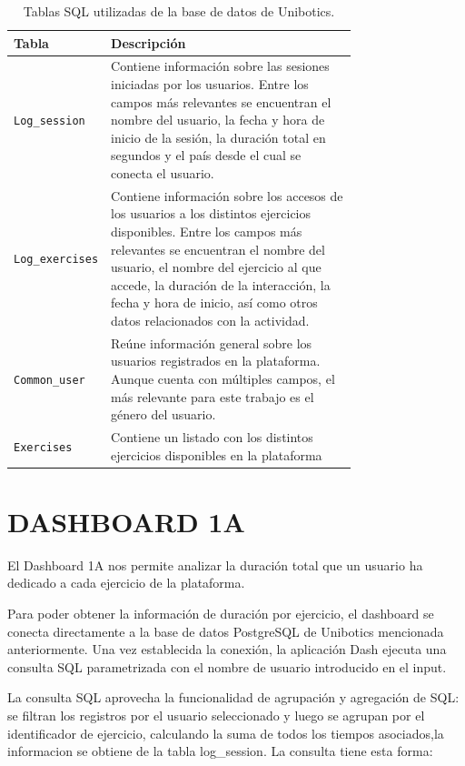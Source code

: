 \documentclass[a4paper, 12pt]{book}
\begin{document}
\begin{table}[!htb]
\centering
\caption{Tablas SQL utilizadas de la base de datos de Unibotics.}
\label{tbl:sql-tables}
\begin{tabular}{lp{0.75\linewidth}}
\toprule
\textbf{Tabla} & \textbf{Descripción} \\
\midrule
\texttt{Log\_session} & Contiene información sobre las sesiones iniciadas por los usuarios. Entre los campos más relevantes se encuentran el nombre del usuario, la fecha y hora de inicio de la sesión, la duración total en segundos y el país desde el cual se conecta el usuario. \\
\texttt{Log\_exercises} & Contiene información sobre los accesos de los usuarios a los distintos ejercicios disponibles. Entre los campos más relevantes se encuentran el nombre del usuario, el nombre del ejercicio al que accede, la duración de la interacción, la fecha y hora de inicio, así como otros datos relacionados con la actividad. \\
\texttt{Common\_user} & Reúne información general sobre los usuarios registrados en la plataforma. Aunque cuenta con múltiples campos, el más relevante para este trabajo es el género del usuario. \\
\texttt{Exercises} & Contiene un listado con los distintos ejercicios disponibles en la plataforma \\
\bottomrule
\end{tabular}
\vspace{1ex}

\end{table}




\section{DASHBOARD 1A}

El Dashboard 1A nos permite analizar la duración total que un usuario ha dedicado a cada ejercicio de la plataforma.

Para poder obtener la información de duración por ejercicio, el dashboard se conecta directamente a la base de datos PostgreSQL de Unibotics mencionada anteriormente.
Una vez establecida la conexión, la aplicación Dash ejecuta una consulta SQL parametrizada con el nombre de usuario introducido en el input.

La consulta SQL aprovecha la funcionalidad de agrupación y agregación de SQL: se filtran los registros por el usuario seleccionado y luego se agrupan por el identificador de ejercicio, calculando la suma de todos los tiempos asociados,la informacion se obtiene de la tabla log\_session. La consulta tiene esta forma:
\end{document}
